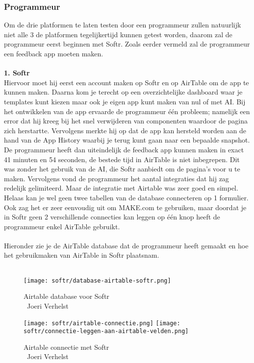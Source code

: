 \subsubsection{Programmeur}%
\label{subsubsec:programmeur}
Om de drie platformen te laten testen door een programmeur zullen natuurlijk niet alle 3 de platformen tegelijkertijd 
kunnen getest worden, daarom zal de programmeur eerst beginnen met Softr. 
Zoals eerder vermeld zal de programmeur een feedback app moeten maken.
\\
\\
\textbf{1. Softr}
\\
Hiervoor moet hij eerst een account maken op Softr en op AirTable om de app te kunnen maken. 
Daarna kom je terecht op een overzichtelijke dashboard waar je templates kunt kiezen maar 
ook je eigen app kunt maken van nul of met AI. Bij het ontwikkelen van de app ervaarde de programmeur één probleem; 
namelijk een error dat hij kreeg bij het snel verwijderen van componenten waardoor de pagina zich herstartte. 
Vervolgens merkte hij op dat de app kan hersteld worden aan de hand van de App History waarbij je terug kunt gaan 
naar een bepaalde snapshot. De programmeur heeft dan uiteindelijk de feedback app 
kunnen maken in exact 41 minuten en 54 seconden, de bestede tijd in AirTable is niet inbegrepen. 
Dit was zonder het gebruik van de AI, die Softr aanbiedt om de pagina’s voor u te maken. Vervolgens vond 
de programmeur het aantal integraties dat hij zag redelijk gelimiteerd. Maar de integratie met Airtable was 
zeer goed en simpel. Helaas kan je wel geen twee tabellen van de database connecteren op 1 formulier. 
Ook zag het er zeer eenvoudig uit om MAKE.com te gebruiken, maar doordat je in Softr geen 2 verschillende connecties 
kan leggen op één knop heeft de programmeur enkel AirTable gebruikt.
\\
\\
Hieronder zie je de AirTable database dat de programmeur heeft gemaakt en hoe het gebruikmaken van AirTable in Softr plaatsnam.
\\
\\
\begin{figure}[H]
    \texttt{[image: softr/database-airtable-softr.png]}
    \caption[Airtable database voor Softr]{Airtable database voor Softr\\\textcopyright\ Joeri Verhelst}
    \label{fig:database-airtable-softr}
\end{figure}
\begin{figure}[H]
    \texttt{[image: softr/airtable-connectie.png]}
    \texttt{[image: softr/connectie-leggen-aan-airtable-velden.png]}
    \caption[Airtable connectie met Softr]{Airtable connectie met Softr\\\textcopyright\ Joeri Verhelst}
    \label{fig:database-airtable-softr-connectie}
\end{figure}

